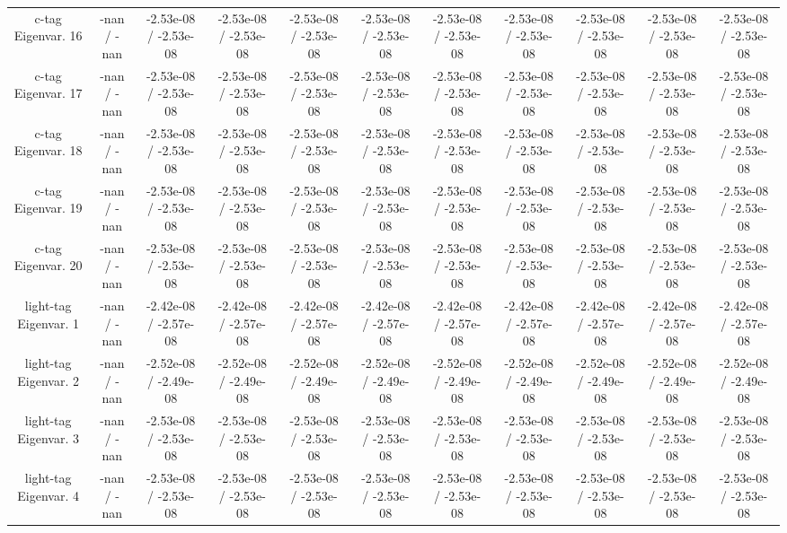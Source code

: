 \begin{table}[htbp]
\begin{center}
\begin{tabular}{|c|c|c|c|c|c|c|c|c|c|c|}
  c-tag Eigenvar. 16 & -nan / -nan & -2.53e-08 / -2.53e-08 & -2.53e-08 / -2.53e-08 & -2.53e-08 / -2.53e-08 & -2.53e-08 / -2.53e-08 & -2.53e-08 / -2.53e-08 & -2.53e-08 / -2.53e-08 & -2.53e-08 / -2.53e-08 & -2.53e-08 / -2.53e-08 & -2.53e-08 / -2.53e-08 \\ 
  c-tag Eigenvar. 17 & -nan / -nan & -2.53e-08 / -2.53e-08 & -2.53e-08 / -2.53e-08 & -2.53e-08 / -2.53e-08 & -2.53e-08 / -2.53e-08 & -2.53e-08 / -2.53e-08 & -2.53e-08 / -2.53e-08 & -2.53e-08 / -2.53e-08 & -2.53e-08 / -2.53e-08 & -2.53e-08 / -2.53e-08 \\ 
  c-tag Eigenvar. 18 & -nan / -nan & -2.53e-08 / -2.53e-08 & -2.53e-08 / -2.53e-08 & -2.53e-08 / -2.53e-08 & -2.53e-08 / -2.53e-08 & -2.53e-08 / -2.53e-08 & -2.53e-08 / -2.53e-08 & -2.53e-08 / -2.53e-08 & -2.53e-08 / -2.53e-08 & -2.53e-08 / -2.53e-08 \\ 
  c-tag Eigenvar. 19 & -nan / -nan & -2.53e-08 / -2.53e-08 & -2.53e-08 / -2.53e-08 & -2.53e-08 / -2.53e-08 & -2.53e-08 / -2.53e-08 & -2.53e-08 / -2.53e-08 & -2.53e-08 / -2.53e-08 & -2.53e-08 / -2.53e-08 & -2.53e-08 / -2.53e-08 & -2.53e-08 / -2.53e-08 \\ 
  c-tag Eigenvar. 20 & -nan / -nan & -2.53e-08 / -2.53e-08 & -2.53e-08 / -2.53e-08 & -2.53e-08 / -2.53e-08 & -2.53e-08 / -2.53e-08 & -2.53e-08 / -2.53e-08 & -2.53e-08 / -2.53e-08 & -2.53e-08 / -2.53e-08 & -2.53e-08 / -2.53e-08 & -2.53e-08 / -2.53e-08 \\ 
  light-tag Eigenvar. 1 & -nan / -nan & -2.42e-08 / -2.57e-08 & -2.42e-08 / -2.57e-08 & -2.42e-08 / -2.57e-08 & -2.42e-08 / -2.57e-08 & -2.42e-08 / -2.57e-08 & -2.42e-08 / -2.57e-08 & -2.42e-08 / -2.57e-08 & -2.42e-08 / -2.57e-08 & -2.42e-08 / -2.57e-08 \\ 
  light-tag Eigenvar. 2 & -nan / -nan & -2.52e-08 / -2.49e-08 & -2.52e-08 / -2.49e-08 & -2.52e-08 / -2.49e-08 & -2.52e-08 / -2.49e-08 & -2.52e-08 / -2.49e-08 & -2.52e-08 / -2.49e-08 & -2.52e-08 / -2.49e-08 & -2.52e-08 / -2.49e-08 & -2.52e-08 / -2.49e-08 \\ 
  light-tag Eigenvar. 3 & -nan / -nan & -2.53e-08 / -2.53e-08 & -2.53e-08 / -2.53e-08 & -2.53e-08 / -2.53e-08 & -2.53e-08 / -2.53e-08 & -2.53e-08 / -2.53e-08 & -2.53e-08 / -2.53e-08 & -2.53e-08 / -2.53e-08 & -2.53e-08 / -2.53e-08 & -2.53e-08 / -2.53e-08 \\ 
  light-tag Eigenvar. 4 & -nan / -nan & -2.53e-08 / -2.53e-08 & -2.53e-08 / -2.53e-08 & -2.53e-08 / -2.53e-08 & -2.53e-08 / -2.53e-08 & -2.53e-08 / -2.53e-08 & -2.53e-08 / -2.53e-08 & -2.53e-08 / -2.53e-08 & -2.53e-08 / -2.53e-08 & -2.53e-08 / -2.53e-08 \\ 

\end{tabular}
\end{center}
\end{table}
